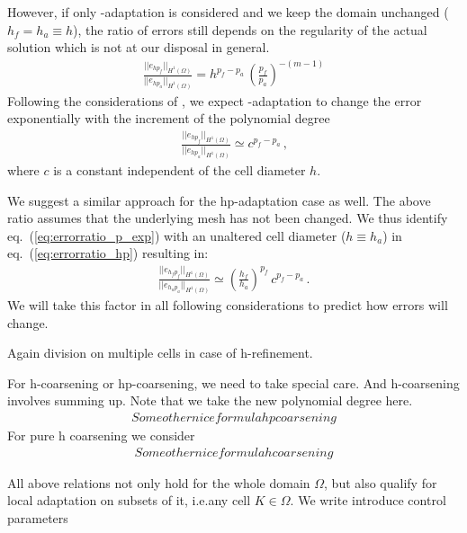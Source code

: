 However, if only \p-adaptation is considered and we keep the domain unchanged ($h_f = h_a \equiv h$), the ratio of errors still depends on the regularity of the actual solution which is not at our disposal in general.
\begin{align}
\label{eq:errorratio_p} \frac{||e_{h p_f}||_{H^{1}(\Omega)}}{||e_{h p_a}||_{H^{1}(\Omega)}} = h^{p_f - p_a} \, \left(\frac{p_f}{p_a}\right)^{-(m-1)}
\end{align}
Following the considerations of \cite{melenk2001}, we expect \p-adaptation to change the error exponentially with the increment of the polynomial degree
\begin{align}
\label{eq:errorratio_p_exp} \frac{||e_{h p_f}||_{H^{1}(\Omega)}}{||e_{h p_a}||_{H^{1}(\Omega)}} \simeq c^{p_f - p_a} \,\text{,}
\end{align}
where $c$ is a constant independent of the cell diameter $h$.

We suggest a similar approach for the hp-adaptation case as well. The above ratio assumes that the underlying mesh has not been changed. We thus identify eq.~(\ref{eq:errorratio_p_exp}) with an unaltered cell diameter ($h \equiv h_a$) in eq.~(\ref{eq:errorratio_hp}) resulting in:
\begin{align}
\label{eq:errorratio_hp_exp} \frac{||e_{h_f p_f}||_{H^{1}(\Omega)}}{||e_{h_a p_a}||_{H^{1}(\Omega)}} \simeq \left( \frac{h_f}{h_a} \right)^{p_f} \, c^{p_f - p_a} \,\text{.}
\end{align}
We will take this factor in all following considerations to predict how errors will change.


Again division on multiple cells in case of h-refinement.

For h-coarsening or hp-coarsening, we need to take special care. And h-coarsening involves summing up. Note that we take the new polynomial degree here.
\begin{align}
Some other nice formula hp coarsening
\end{align}
For pure h coarsening we consider
\begin{align}
Some other nice formula h coarsening
\end{align}


All above relations not only hold for the whole domain $\Omega$, but also qualify for local adaptation on subsets of it, i.e.\@ any cell $K \in \Omega$. We write introduce control parameters

